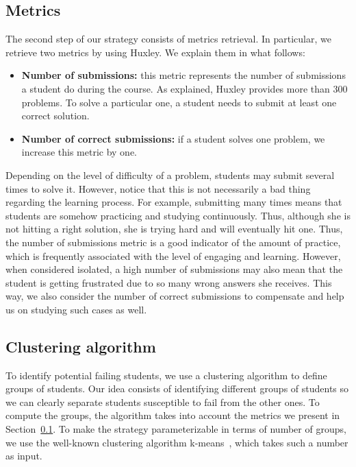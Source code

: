 \subsection{Metrics}

\label{sec:metrics}

The second step of our strategy consists of metrics retrieval. In particular, we retrieve two metrics by using Huxley. We explain them in what follows:

\begin{itemize}

	\item \textbf{Number of submissions:} this metric represents the number of submissions a student do during the course. As explained, Huxley provides more than 300 problems. To solve a particular one, a student needs to submit at least one correct solution.

	\item \textbf{Number of correct submissions:} if a student solves one problem, we increase this metric by one.

\end{itemize}

Depending on the level of difficulty of a problem, students may submit several times to solve it. However, notice that this is not necessarily a bad thing regarding the learning process. For example, submitting many times means that students are somehow practicing and studying continuously. Thus, although she is not hitting a right solution, she is trying hard and will eventually hit one. Thus, the number of submissions metric is a good indicator of the amount of practice, which is frequently associated with the level of engaging and learning. However, when considered isolated, a high number of submissions may also mean that the student is getting frustrated due to so many wrong answers she receives. This way, we also consider the number of correct submissions to compensate and help us on studying such cases as well.


\subsection{Clustering algorithm}

To identify potential failing students, we use a clustering algorithm to define groups of students. Our idea consists of identifying different groups of students so we can clearly separate students susceptible to fail from the other ones. To compute the groups, the algorithm takes into account the metrics we present in Section~\ref{sec:metrics}. To make the strategy parameterizable in terms of number of groups, we use the well-known clustering algorithm k-means~\cite{}, which takes such a number as input.

